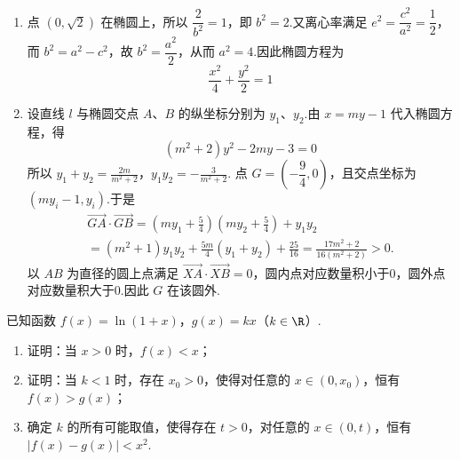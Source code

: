 \begin{solution}
\begin{enumerate}
\item 点 \((0,\sqrt2)\) 在椭圆上，所以 \(\dfrac{2}{b^2}=1\)，即 \(b^2=2\).又离心率满足
\(e^2=\dfrac{c^2}{a^2}=\dfrac12\)，而 \(b^2=a^2-c^2\)，故 \(b^2=\dfrac{a^2}{2}\)，从而 \(a^2=4\).因此椭圆方程为
\[
\frac{x^2}{4}+\frac{y^2}{2}=1
\]

\item 设直线 \(l\) 与椭圆交点 \(A\)、\(B\) 的纵坐标分别为 \(y_1\)、\(y_2\).由 \(x=my-1\) 代入椭圆方程，得
\[
(m^2+2)y^2-2my-3=0
\]
所以
\(y_1+y_2=\frac{2m}{m^2+2}\)，\(y_1y_2=-\frac{3}{m^2+2}\).
点 \(G=(-\dfrac94,0)\)，且交点坐标为 \((my_i-1,y_i)\).于是
\[
\begin{gathered}
\overrightarrow{GA}\cdot\overrightarrow{GB}
 =(my_1+\tfrac54)(my_2+\tfrac54)+y_1y_2\\
 =(m^2+1)y_1y_2+\frac{5m}{4}(y_1+y_2)+\frac{25}{16}
 =\frac{17m^2+2}{16(m^2+2)}>0.
\end{gathered}
\]
以 \(AB\) 为直径的圆上点满足 \(\overrightarrow{XA}\cdot\overrightarrow{XB}=0\)，圆内点对应数量积小于0，圆外点对应数量积大于0.因此 \(G\) 在该圆外.
\end{enumerate}
\end{solution}

\begin{problem}
已知函数 \(f(x) = \ln (1 + x)\)，\(g(x) = kx\)（\(k \in \R\)）.
\begin{enumerate}
\item 证明：当 \(x > 0\) 时，\(f(x) < x\)；
\item 证明：当 \(k < 1\) 时，存在 \(x_0 > 0\)，使得对任意的 \(x \in (0, x_0)\)，恒有 \(f(x) > g(x)\)；
\item 确定 \(k\) 的所有可能取值，使得存在 \(t > 0\)，对任意的 \(x \in (0, t)\)，恒有 \(|f(x) - g(x)| < x^2\).
\end{enumerate}
\end{problem}

